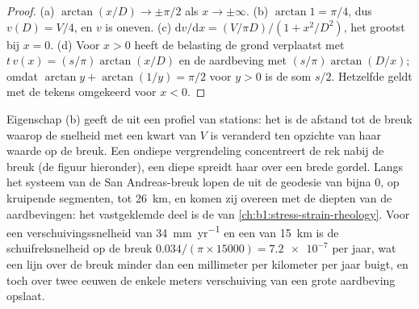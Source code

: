 \begin{proof}
(a) $\arctan(x/D) \to \pm\pi/2$ als $x \to \pm\infty$. (b) $\arctan 1 = \pi/4$, dus $v(D) = V/4$, en $v$ is oneven. (c) $\mathrm dv/\mathrm dx = (V/\pi D)/(1 +
x^2/D^2)$, het grootst bij $x = 0$. (d) Voor $x > 0$ heeft de belasting de grond verplaatst met $t\,v(x) = (s/\pi)\arctan(x/D)$ en de aardbeving met
$(s/\pi)\arctan(D/x)$; omdat $\arctan y + \arctan(1/y) = \pi/2$ voor $y > 0$ is de som $s/2$. Hetzelfde geldt met de tekens omgekeerd voor $x < 0$.
\end{proof}

Eigenschap (b) geeft de  uit een profiel van stations: het is de afstand tot de breuk waarop de snelheid met een kwart van $V$ is veranderd ten opzichte van haar waarde op de breuk. Een ondiepe vergrendeling concentreert de rek nabij de breuk (de figuur hieronder), een diepe spreidt haar over een brede gordel.
Langs het systeem van de San Andreas-breuk lopen de  uit de geodesie van bijna 0, op kruipende segmenten, tot \qty{26}{km}, en komen zij overeen met de diepten van de aardbevingen: het vastgeklemde deel is de  van \cref{ch:b1:stress-strain-rheology}. Voor een verschuivingssnelheid van \qty{34}{mm.yr^{-1}} en een  van \qty{15}{km} is de schuifreksnelheid op de breuk $\num{0.034}/(\pi\times\num{15000}) = \num{7.2e-7}$ per jaar, wat een lijn over de breuk minder dan een millimeter per kilometer per jaar buigt, en toch over twee eeuwen de enkele meters verschuiving van een grote aardbeving opslaat.

